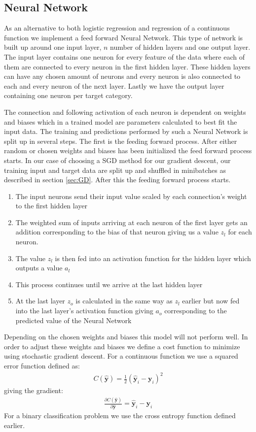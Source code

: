 \documentclass[11pt]{article}
\begin{document}
\subsection{Neural Network}
As an alternative to both logistic regression and regression of a continuous function we implement a feed forward Neural Network. This type of network is built up around one input layer, $n$ number of hidden layers and one output layer. The input layer contains one neuron for every feature of the data where each of them are connected to every neuron in the first hidden layer. These hidden layers can have any chosen amount of neurons and every neuron is also connected to each and every neuron of the next layer. Lastly we have the output layer containing one neuron per target category.

The connection and following activation of each neuron is dependent on weights and biases which in a trained model are parameters calculated to best fit the input data. The training and predictions performed by such a Neural Network is split up in several steps. The first is the feeding forward process. After either random or chosen weights and biases has been initialized the feed forward process starts. In our case of choosing a SGD method for our gradient descent, our training input and target data are split up and shuffled in minibatches as described in section \ref{sec:GD}. After this the feeding forward process starts.
\begin{enumerate}
    \item The input neurons send their input value scaled by each connection's weight to the first hidden layer
    \item The weighted sum of inputs arriving at each neuron of the first layer gets an addition corresponding to the bias of that neuron giving us a value $z_l$ for each neuron.
    \item The value $z_l$ is then fed into an activation function for the hidden layer which outputs a value $a_l$
    \item This process continues until we arrive at the last hidden layer
    \item At the last layer $z_o$ is calculated in the same way as $z_l$ earlier but now fed into the last layer's activation function giving $a_o$ corresponding to the predicted value of the Neural Network
\end{enumerate}
Depending on the chosen weights and biases this model will not perform well. In order to adjust these weights and biases we define a cost function to minimize using stochastic gradient descent. For a continuous function we use a squared error function defined as:
\begin{align*}
    C(\hat{\boldsymbol{y}}) = \frac{1}{2}(\hat{\boldsymbol{y}}_i - \boldsymbol{y}_i)^2
\end{align*}
giving the gradient:
\begin{align*}
    \frac{\partial C(\hat{\boldsymbol{y}})}{\partial  \hat{\boldsymbol{y}}} = \hat{\boldsymbol{y}}_i - \boldsymbol{y}_i
\end{align*}
For a binary classification problem we use the cross entropy function defined earlier.
\end{document}
